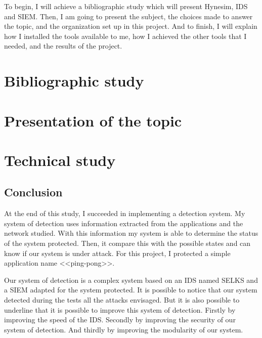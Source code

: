 \documentclass[a4paper, 11pt, oneside, oldfontcommands]{memoir}
\newcounter{th}[chapter]
\begin{document}
To begin, I will achieve a bibliographic study which will present Hynesim, IDS and SIEM. Then, I am going to
present the subject, the choices made to answer the topic, and the organization set up in this project. And to
finish, I will explain how I installed the tools available to me, how I achieved the other tools that I needed, and
the results of the project.

\newpage


\part{Bibliographic study}
  
  
  

  \part{Presentation of the topic}
  \label{part:2}
  
  
  

\part{Technical study}
  
  
  




\chapter*{Conclusion}

At the end of this study, I succeeded in implementing a detection system. My system of detection uses information
extracted from the applications and the network studied. With this information my system is able to determine the
status of the system protected. Then, it compare this with the possible states and can know if our system is under
attack. For this project, I protected a simple application name <<ping-pong>>.


Our system of detection is a complex system based on an IDS named SELKS and a SIEM adapted for the system
protected. It is possible to notice that our system detected during the tests all the attacks envisaged. But it is
also possible to underline that it is possible to improve this system of detection. Firstly by improving the speed
of the IDS. Secondly by improving the security of our system of detection. And thirdly by improving the modularity
of our system.
\end{document}
